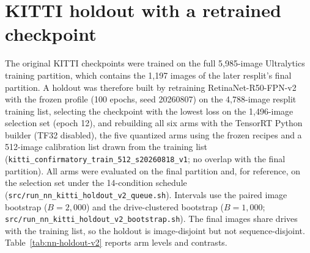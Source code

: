 \documentclass[10pt]{article}
\newcommand{\Jclean}{\mathrm{J95}}
\newcommand{\sigstar}{\textsuperscript{*}}
\begin{document}
\begin{table}[htbp]
\centering\scriptsize
\caption{Max-calibration counterfactual on RetinaNet (post-hoc diagnostic,
single builds, plug-in AP points without intervals). Reference rows repeat
the frozen entropy-calibrated paired-protocol arms for the same
detector--dataset pairs; bold rows are the max-estimator arms on the same
14-condition schedule: graph-wide matched/selective, then the variant with
the max estimator applied only to activation quantizers consumed by the
regression head (including the five FPN-boundary quantizers shared with the
classification head). ``Orig.\ clean'' is the original clean image;
``$\Jclean$'' is the JPEG quality-95 codec control.}
\label{tab:nn-maxcalib}
{\setlength{\tabcolsep}{3pt}}
\end{table}

\section{KITTI holdout with a retrained checkpoint}
\label{sec:nn-holdout}

The original KITTI checkpoints were trained on the full 5,985-image
Ultralytics training partition, which contains the 1,197 images of the later
resplit's final partition. A holdout was therefore built by retraining
RetinaNet-R50-FPN-v2 with the frozen profile (100 epochs, seed 20260807) on
the 4,788-image resplit training list, selecting the checkpoint with the
lowest loss on the 1,496-image selection set (epoch 12), and rebuilding all
six arms with the TensorRT Python builder (TF32 disabled), the five quantized
arms using the frozen recipes and a 512-image calibration list drawn from
the training list (\texttt{kitti\_confirmatory\_train\_512\_s20260818\_v1}; no
overlap with the final partition). All arms were evaluated on the final
partition and, for reference, on the selection set under the 14-condition
schedule (\texttt{src/run\_nn\_kitti\_holdout\_v2\_queue.sh}). Intervals use the
paired image bootstrap ($B=2{,}000$) and the drive-clustered bootstrap
($B=1{,}000$; \texttt{src/run\_nn\_kitti\_holdout\_v2\_bootstrap.sh}). The
final images share drives with the training list, so the holdout is
image-disjoint but not sequence-disjoint. Table~\ref{tab:nn-holdout-v2}
reports arm levels and contrasts.

\begin{table}[htbp]
\centering\scriptsize
\caption{RetinaNet on the KITTI holdout (1,197 images unseen by the retrained
checkpoint). Top: arm levels in AP on the final holdout and, for reference, on
the selection set; ``Orig.\ clean'': original clean images; ``Corrupt'': equal-weight
mean over the 12 corruption--severity cells. Bottom: paired contrasts with 95\% intervals from the image
bootstrap and, on the $\Jclean$ basis, the drive-clustered bootstrap.
\sigstar{}: unadjusted interval excludes zero.}
\label{tab:nn-holdout-v2}
{\setlength{\tabcolsep}{3pt}}
\end{table}
\end{document}
